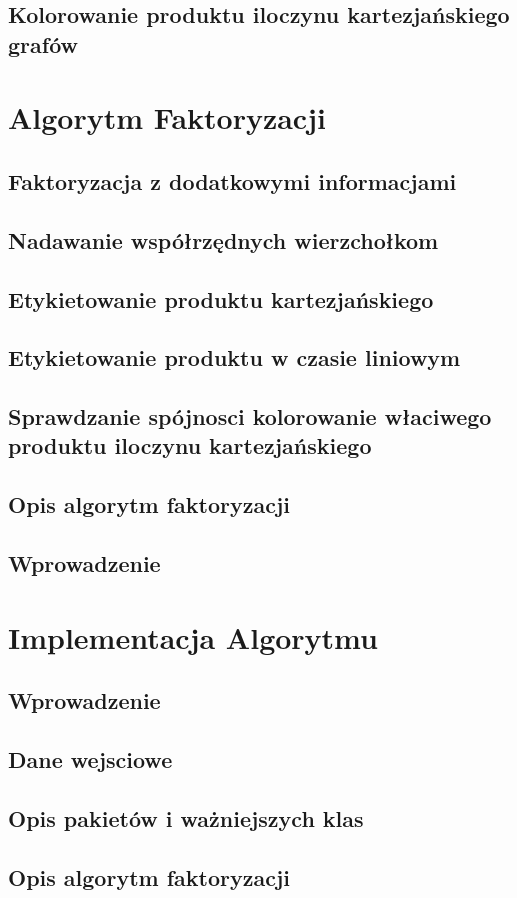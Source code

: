 \documentclass[12pt,a4paper,titlepage]{article}
\begin{document}
\subsection{Kolorowanie produktu iloczynu kartezjańskiego grafów}

\section{Algorytm Faktoryzacji}
\subsection{Faktoryzacja z dodatkowymi informacjami}
\subsection{Nadawanie współrzędnych wierzchołkom}
\subsection{Etykietowanie produktu kartezjańskiego}
\subsection{Etykietowanie produktu w czasie liniowym}
\subsection{Sprawdzanie spójnosci kolorowanie właciwego produktu iloczynu kartezjańskiego}
\subsection{Opis algorytm faktoryzacji}
\subsection{Wprowadzenie}
\section{Implementacja Algorytmu}
\subsection{Wprowadzenie}
\subsection{Dane wejsciowe}
\subsection{Opis pakietów i ważniejszych  klas}
\subsection{Opis algorytm faktoryzacji}
\end{document}
